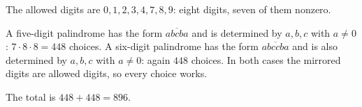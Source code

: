 The allowed digits are $0,1,2,3,4,7,8,9$: eight digits, seven of them nonzero.

A five-digit palindrome has the form $\overline{abcba}$ and is determined by $a,b,c$ with $a\ne0$: $7\cdot8\cdot8=448$ choices. A six-digit palindrome has the form $\overline{abccba}$ and is also determined by $a,b,c$ with $a\ne0$: again $448$ choices. In both cases the mirrored digits are allowed digits, so every choice works.

The total is $448+448=\boxed{896}$.
